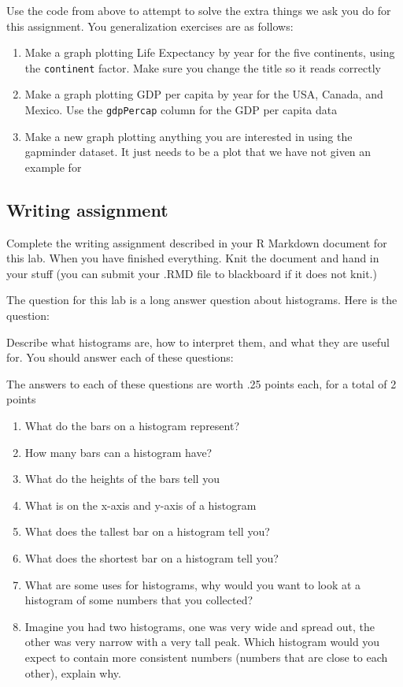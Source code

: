 \documentclass[]{book}
\providecommand{\tightlist}{%
  \setlength{\itemsep}{0pt}\setlength{\parskip}{0pt}}
\begin{document}
Use the code from above to attempt to solve the extra things we ask you
do for this assignment. You generalization exercises are as follows:

\begin{enumerate}
\def\labelenumi{\arabic{enumi}.}
\item
  Make a graph plotting Life Expectancy by year for the five continents,
  using the \texttt{continent} factor. Make sure you change the title so
  it reads correctly
\item
  Make a graph plotting GDP per capita by year for the USA, Canada, and
  Mexico. Use the \texttt{gdpPercap} column for the GDP per capita data
\item
  Make a new graph plotting anything you are interested in using the
  gapminder dataset. It just needs to be a plot that we have not given
  an example for
\end{enumerate}

\subsection{Writing assignment}\label{writing-assignment}

Complete the writing assignment described in your R Markdown document
for this lab. When you have finished everything. Knit the document and
hand in your stuff (you can submit your .RMD file to blackboard if it
does not knit.)

The question for this lab is a long answer question about histograms.
Here is the question:

Describe what histograms are, how to interpret them, and what they are
useful for. You should answer each of these questions:

The answers to each of these questions are worth .25 points each, for a
total of 2 points

\begin{enumerate}
\def\labelenumi{\alph{enumi}.}
\tightlist
\item
  What do the bars on a histogram represent?
\item
  How many bars can a histogram have?
\item
  What do the heights of the bars tell you
\item
  What is on the x-axis and y-axis of a histogram
\item
  What does the tallest bar on a histogram tell you?
\item
  What does the shortest bar on a histogram tell you?
\item
  What are some uses for histograms, why would you want to look at a
  histogram of some numbers that you collected?
\item
  Imagine you had two histograms, one was very wide and spread out, the
  other was very narrow with a very tall peak. Which histogram would you
  expect to contain more consistent numbers (numbers that are close to
  each other), explain why.
\end{enumerate}
\end{document}
